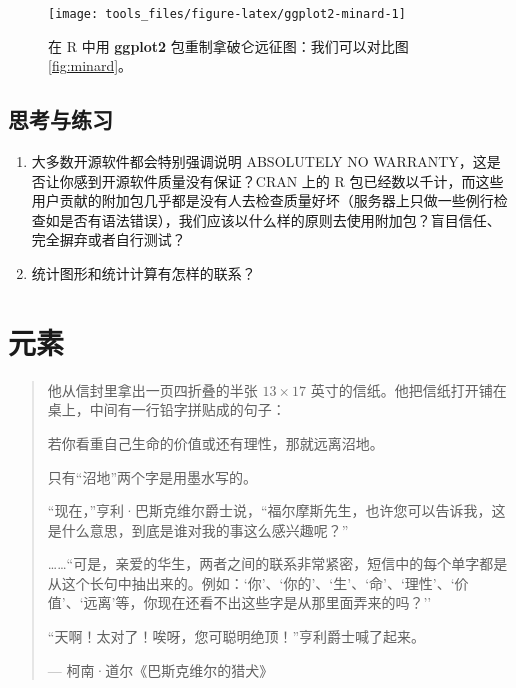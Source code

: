 \documentclass[
  b5paper,
  UTF8,twoside]{book}
\begin{document}
\begin{figure}

{\centering \texttt{[image: tools\_files/figure-latex/ggplot2-minard-1]} 

}

\caption[在 R 中用 \textbf{ggplot2} 包重制拿破仑远征图]{在 R 中用 \textbf{ggplot2} 包重制拿破仑远征图：我们可以对比图 \ref{fig:minard}。}\label{fig:ggplot2-minard}
\end{figure}

\hypertarget{ux601dux8003ux4e0eux7ec3ux4e60-1}{%
\section{思考与练习}\label{ux601dux8003ux4e0eux7ec3ux4e60-1}}

\begin{enumerate}
\def\labelenumi{\arabic{enumi}.}
\item
  大多数开源软件都会特别强调说明 ABSOLUTELY NO WARRANTY，这是否让你感到开源软件质量没有保证？CRAN 上的 R 包已经数以千计，而这些用户贡献的附加包几乎都是没有人去检查质量好坏（服务器上只做一些例行检查如是否有语法错误），我们应该以什么样的原则去使用附加包？盲目信任、完全摒弃或者自行测试？
\item
  统计图形和统计计算有怎样的联系？
\end{enumerate}

\hypertarget{cha:elements}{%
\chapter{元素}\label{cha:elements}}

\begin{quote}
他从信封里拿出一页四折叠的半张 \(13\times17\) 英寸的信纸。他把信纸打开铺在桌上，中间有一行铅字拼贴成的句子：

若你看重自己生命的价值或还有理性，那就远离沼地。

只有``沼地''两个字是用墨水写的。

``现在，''亨利·巴斯克维尔爵士说，``福尔摩斯先生，也许您可以告诉我，这是什么意思，到底是谁对我的事这么感兴趣呢？''

\ldots\ldots{}``可是，亲爱的华生，两者之间的联系非常紧密，短信中的每个单字都是从这个长句中抽出来的。例如：`你'、`你的'、`生'、`命'、`理性'、`价值'、`远离'等，你现在还看不出这些字是从那里面弄来的吗？''

``天啊！太对了！唉呀，您可聪明绝顶！''亨利爵士喊了起来。

\hspace*{\fill} --- 柯南·道尔《巴斯克维尔的猎犬》
\end{quote}
\end{document}
